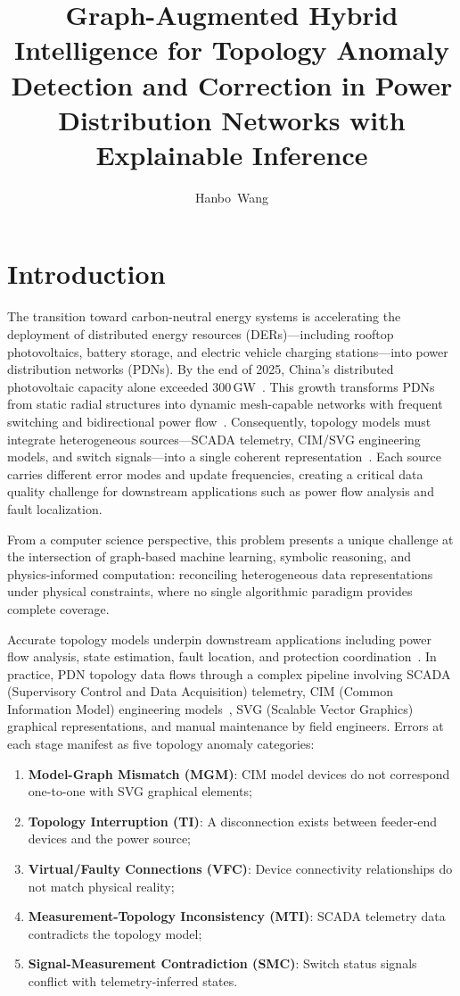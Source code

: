 \documentclass[research]{fcs}
\title{Graph-Augmented Hybrid Intelligence for Topology Anomaly Detection and Correction in Power Distribution Networks with Explainable Inference}
\author[1,+]{Hanbo~Wang}
\begin{document}
\section{Introduction}

The transition toward carbon-neutral energy systems is accelerating the deployment of distributed energy resources (DERs)---including rooftop photovoltaics, battery storage, and electric vehicle charging stations---into power distribution networks (PDNs). By the end of 2025, China's distributed photovoltaic capacity alone exceeded 300\,GW~\cite{cim2013energy}. This growth transforms PDNs from static radial structures into dynamic mesh-capable networks with frequent switching and bidirectional power flow~\cite{baldi2022tutorial,learning_grid_topologies2022}. Consequently, topology models must integrate heterogeneous sources---SCADA telemetry, CIM/SVG engineering models, and switch signals---into a single coherent representation~\cite{nature_energy_ai_grid,xai_cps2026,zhang_graph_anomaly_tii2024}. Each source carries different error modes and update frequencies, creating a critical data quality challenge for downstream applications such as power flow analysis and fault localization.

From a computer science perspective, this problem presents a unique challenge at the intersection of graph-based machine learning, symbolic reasoning, and physics-informed computation: reconciling heterogeneous data representations under physical constraints, where no single algorithmic paradigm provides complete coverage.

Accurate topology models underpin downstream applications including power flow analysis, state estimation, fault location, and protection coordination~\cite{abur2004power,wood2014power}. In practice, PDN topology data flows through a complex pipeline involving SCADA (Supervisory Control and Data Acquisition) telemetry, CIM (Common Information Model) engineering models~\cite{cim2013energy,dimitrovski2023cim}, SVG (Scalable Vector Graphics) graphical representations, and manual maintenance by field engineers. Errors at each stage manifest as five topology anomaly categories:

\begin{enumerate}
\item \textbf{Model-Graph Mismatch (MGM)}: CIM model devices do not correspond one-to-one with SVG graphical elements;
\item \textbf{Topology Interruption (TI)}: A disconnection exists between feeder-end devices and the power source;
\item \textbf{Virtual/Faulty Connections (VFC)}: Device connectivity relationships do not match physical reality;
\item \textbf{Measurement-Topology Inconsistency (MTI)}: SCADA telemetry data contradicts the topology model;
\item \textbf{Signal-Measurement Contradiction (SMC)}: Switch status signals conflict with telemetry-inferred states.
\end{enumerate}
\end{document}
